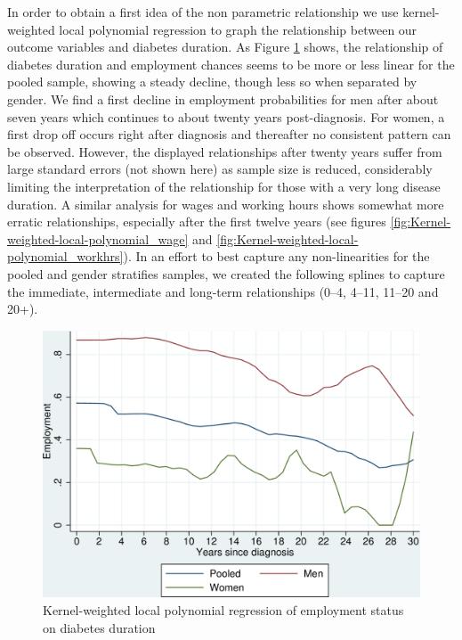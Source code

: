\documentclass[12pt,english,british]{article}
\begin{document}
In order to obtain a first idea of the non parametric relationship
we use kernel-weighted local polynomial regression to graph the relationship
between our outcome variables and diabetes duration. As Figure \ref{fig:Kernel-weighted-local-polynomial_empl}
shows, the relationship of diabetes duration and employment chances
seems to be more or less linear for the pooled sample, showing a steady
decline, though less so when separated by gender. We find a first
decline in employment probabilities for men after about seven years
which continues to about twenty years post-diagnosis. For women,
a first drop off occurs right after diagnosis and thereafter no consistent
pattern can be observed. However, the displayed relationships after
twenty years suffer from large standard errors (not shown here) as sample size is reduced,
considerably limiting the interpretation of the relationship for those with a very long disease duration. A similar analysis for wages and working hours shows
somewhat more erratic relationships, especially after the first twelve
years (see figures \ref{fig:Kernel-weighted-local-polynomial_wage} and \ref{fig:Kernel-weighted-local-polynomial_workhrs}). In an effort to best capture any non-linearities for the pooled
and gender stratifies samples, we created the following splines to
capture the immediate, intermediate and long-term relationships (0--4,
4--11, 11--20 and 20+).   
  

\begin{figure}[h!]
\caption{\label{fig:Kernel-weighted-local-polynomial_empl}Kernel-weighted local
polynomial regression of employment status on diabetes duration}%
\begin{center}
\includegraphics[width=0.7\columnwidth]{figures/lpoly_works_diabetesduration/lpoly_works_diabetesduration}
\end{center}
\end{figure}
\end{document}
